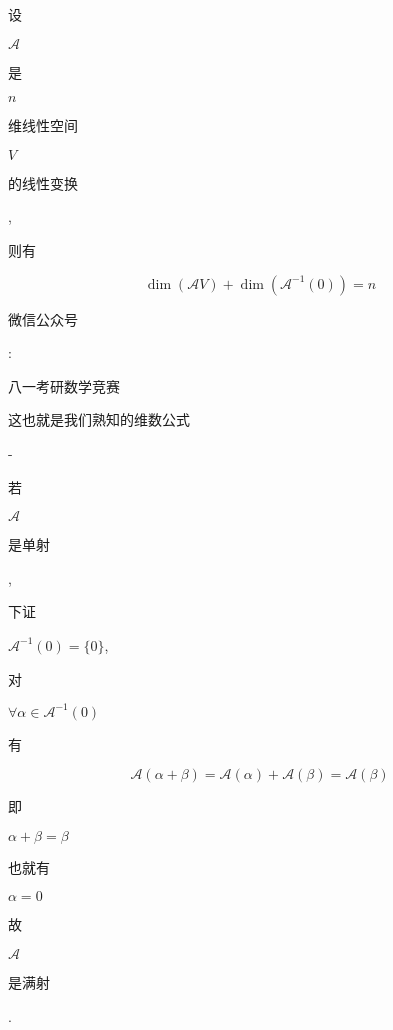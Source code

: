 \documentclass[10pt]{article}
\begin{document}
\begin{CJK}{UTF8}{mj}设\end{CJK} $\mathscr{A}$ \begin{CJK}{UTF8}{mj}是\end{CJK} $n$ \begin{CJK}{UTF8}{mj}维线性空间\end{CJK} $V$ \begin{CJK}{UTF8}{mj}的线性变换\end{CJK}, \begin{CJK}{UTF8}{mj}则有\end{CJK}
$$
\operatorname{dim}(\mathscr{A} V)+\operatorname{dim}\left(\mathscr{A}^{-1}(0)\right)=n
$$
\begin{CJK}{UTF8}{mj}微信公众号\end{CJK}: \begin{CJK}{UTF8}{mj}八一考研数学竞赛\end{CJK} \begin{CJK}{UTF8}{mj}这也就是我们熟知的维数公式\end{CJK} - \begin{CJK}{UTF8}{mj}若\end{CJK} $\mathscr{A}$ \begin{CJK}{UTF8}{mj}是单射\end{CJK}, \begin{CJK}{UTF8}{mj}下证\end{CJK} $\mathscr{A}^{-1}(0)=\{0\}$, \begin{CJK}{UTF8}{mj}对\end{CJK} $\forall \alpha \in \mathscr{A}^{-1}(0)$ \begin{CJK}{UTF8}{mj}有\end{CJK}
$$
\mathscr{A}(\alpha+\beta)=\mathscr{A}(\alpha)+\mathscr{A}(\beta)=\mathscr{A}(\beta)
$$
\begin{CJK}{UTF8}{mj}即\end{CJK} $\alpha+\beta=\beta$ \begin{CJK}{UTF8}{mj}也就有\end{CJK} $\alpha=0$ \begin{CJK}{UTF8}{mj}故\end{CJK} $\mathscr{A}$ \begin{CJK}{UTF8}{mj}是满射\end{CJK}.
\end{document}

